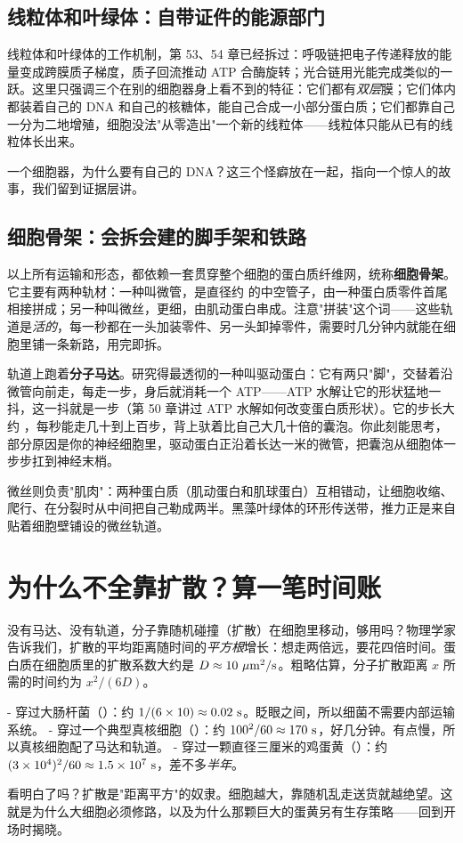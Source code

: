 \subsection{线粒体和叶绿体：自带证件的能源部门}

线粒体和叶绿体的工作机制，第 53、54 章已经拆过：呼吸链把电子传递释放的能量变成跨膜质子梯度，质子回流推动 ATP 合酶旋转；光合链用光能完成类似的一跃。这里只强调三个在别的细胞器身上看不到的特征：它们都有\emph{双层}膜；它们体内都装着自己的 DNA 和自己的核糖体，能自己合成一小部分蛋白质；它们都靠自己一分为二地增殖，细胞没法"从零造出"一个新的线粒体——线粒体只能从已有的线粒体长出来。

一个细胞器，为什么要有自己的 DNA？这三个怪癖放在一起，指向一个惊人的故事，我们留到证据层讲。

\subsection{细胞骨架：会拆会建的脚手架和铁路}

以上所有运输和形态，都依赖一套贯穿整个细胞的蛋白质纤维网，统称\textbf{细胞骨架}。它主要有两种轨材：一种叫微管，是直径约  的中空管子，由一种蛋白质零件首尾相接拼成；另一种叫微丝，更细，由肌动蛋白串成。注意"拼装"这个词——这些轨道是\emph{活的}，每一秒都在一头加装零件、另一头卸掉零件，需要时几分钟内就能在细胞里铺一条新路，用完即拆。

轨道上跑着\textbf{分子马达}。研究得最透彻的一种叫驱动蛋白：它有两只"脚"，交替着沿微管向前走，每走一步，身后就消耗一个 ATP——ATP 水解让它的形状猛地一抖，这一抖就是一步（第 50 章讲过 ATP 水解如何改变蛋白质形状）。它的步长大约 ，每秒能走几十到上百步，背上驮着比自己大几十倍的囊泡。你此刻能思考，部分原因是你的神经细胞里，驱动蛋白正沿着长达一米的微管，把囊泡从细胞体一步步扛到神经末梢。

微丝则负责"肌肉"：两种蛋白质（肌动蛋白和肌球蛋白）互相错动，让细胞收缩、爬行、在分裂时从中间把自己勒成两半。黑藻叶绿体的环形传送带，推力正是来自贴着细胞壁铺设的微丝轨道。

\section{为什么不全靠扩散？算一笔时间账}

\begin{qiaoliang}
没有马达、没有轨道，分子靠随机碰撞（扩散）在细胞里移动，够用吗？物理学家告诉我们，扩散的平均距离随时间的\emph{平方根}增长：想走两倍远，要花四倍时间。蛋白质在细胞质里的扩散系数大约是 $D\approx10\ \mathrm{\mu m^2/s}$。粗略估算，分子扩散距离 $x$ 所需的时间约为 $x^2/(6D)$。

- 穿过大肠杆菌（）：约 $1/(6\times10)\approx0.02\ \mathrm{s}$。眨眼之间，所以细菌不需要内部运输系统。
- 穿过一个典型真核细胞（）：约 $100^2/60\approx170\ \mathrm{s}$，好几分钟。有点慢，所以真核细胞配了马达和轨道。
- 穿过一颗直径三厘米的鸡蛋黄（）：约 $(3\times10^{4})^2/60\approx1.5\times10^{7}\ \mathrm{s}$，差不多\emph{半年}。

看明白了吗？扩散是"距离平方"的奴隶。细胞越大，靠随机乱走送货就越绝望。这就是为什么大细胞必须修路，以及为什么那颗巨大的蛋黄另有生存策略——回到开场时揭晓。
\end{qiaoliang}

